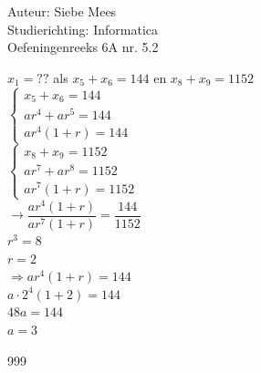 \documentclass[a4paper]{article}
\begin{document}
  
\noindent \large Auteur: Siebe Mees \\
\noindent \large Studierichting: Informatica\\
\noindent \large Oefeningenreeks 6A nr. 5.2\\

\medskip

\normalsize

$x_1 = ?? $ als $ x_5 + x_6 = 144 $ en $ x_8 + x_9 = 1152$\\

$ \left \{
\begin{array}{l}
x_5 + x_6 = 144\\
ar^4 + ar^5 = 144\\
ar^4(1+r) = 144
\end{array}
\right .$\\

$ \left \{
\begin{array}{l}
x_8 + x_9 = 1152\\
ar^7 + ar^8 = 1152\\
ar^7(1+r) = 1152
\end{array}
\right .$\\

$\rightarrow \dfrac{ar^4(1+r)}{ar^7(1+r)} = \dfrac{144}{1152}$\\

$r^3 = 8$\\

$r = 2$\\

$\Rightarrow ar^4(1+r) = 144$\\

$a \cdot 2^4(1+2) = 144$\\

$48a = 144$\\

$a = 3$\\

\begin{thebibliography}{999}
\end{thebibliography}
\end{document}

